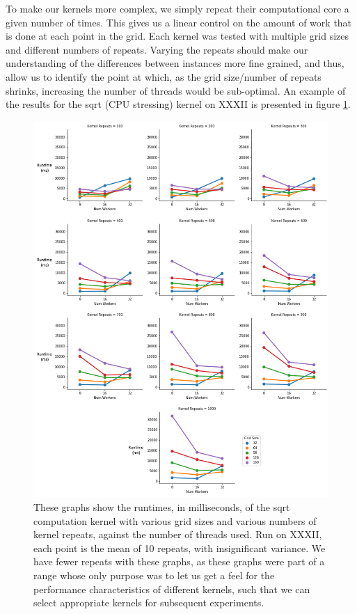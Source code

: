 To make our kernels more complex, we simply repeat their computational core a given number of times. This gives us a linear control on the amount of work that is done at each point in the grid. Each kernel was tested with multiple grid sizes and different numbers of repeats. Varying the repeats should make our understanding of the differences between instances more fine grained, and thus, allow us to identify the point at which, as the grid size/number of repeats shrinks, increasing the number of threads would be sub-optimal. An example of the results for the sqrt (CPU stressing) kernel on XXXII is presented in figure \ref{fig:focustest3}.



\begin{figure}[H]
    \vspace*{-1.5in}
    \centerline{\includegraphics[width=1.3\textwidth]{graphics/interesting_instances/focustest3_2.png}}
    \caption{These graphs show the runtimes, in milliseconds, of the sqrt computation kernel with various grid sizes and various numbers of kernel repeats, against the number of threads used. Run on XXXII, each point is the mean of 10 repeats, with insignificant variance. We have fewer repeats with these graphs, as these graphs were part of a range whose only purpose was to let us get a feel for the performance characteristics of different kernels, such that we can select appropriate kernels for subsequent experiments.}
    \label{fig:focustest3}
\end{figure}



